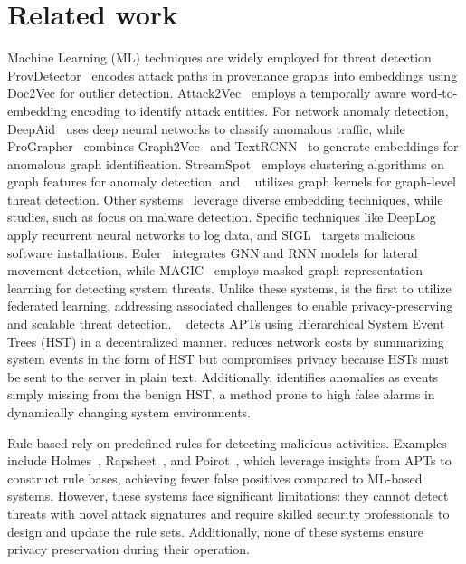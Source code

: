 \section{Related work}
\label{s:relwk}


 Machine Learning (ML) techniques are widely employed for threat detection. ProvDetector~\cite{provdetector2020} encodes attack paths in provenance graphs into embeddings using Doc2Vec\cite{le2014distributed} for outlier detection. Attack2Vec~\cite{shen2019attack2vec} employs a temporally aware word-to-embedding encoding to identify attack entities. For network anomaly detection, DeepAid~\cite{deepaid} uses deep neural networks to classify anomalous traffic, while ProGrapher~\cite{yangprographer} combines Graph2Vec~\cite{narayanan2017graph2vec} and TextRCNN~\cite{lai2015recurrent} to generate embeddings for anomalous graph identification. StreamSpot~\cite{streamspot} employs clustering algorithms on graph features for anomaly detection, and \unicorn~\cite{han2020unicorn} utilizes graph kernels for graph-level threat detection. Other systems~\cite{aljawarneh2018anomaly, maseer2021benchmarking, gyanchandani2012taxonomy, atlas} leverage diverse embedding techniques, while studies, such as \cite{zolkipli2011approach, chakkaravarthy2019survey, isohara2011kernel} focus on malware detection. Specific techniques like DeepLog~\cite{deeplog2017} apply recurrent neural networks to log data, and SIGL~\cite{sigl} targets malicious software installations. Euler~\cite{king2022euler} integrates GNN and RNN models for lateral movement detection, while MAGIC~\cite{jia2023magic} employs masked graph representation learning for detecting system threats. Unlike these systems, \Sys is the first to utilize federated learning, addressing associated challenges to enable privacy-preserving and scalable threat detection. \disdet~\cite{dong2023distdet} detects APTs using Hierarchical System Event Trees (HST) in a decentralized manner. \disdet reduces network costs by summarizing system events in the form of HST but compromises privacy because HSTs must be sent to the server in plain text. Additionally, \disdet identifies anomalies as events simply missing from the benign HST, a method prone to high false alarms in dynamically changing system environments.


 Rule-based \pids rely on predefined rules for detecting malicious activities. Examples include Holmes~\cite{holmes2019}, Rapsheet~\cite{rapsheet2020}, and Poirot~\cite{poirot2019}, which leverage insights from APTs to construct rule bases, achieving fewer false positives compared to ML-based systems. However, these systems face significant limitations: they cannot detect threats with novel attack signatures and require skilled security professionals to design and update the rule sets. Additionally, none of these systems ensure privacy preservation during their operation.

